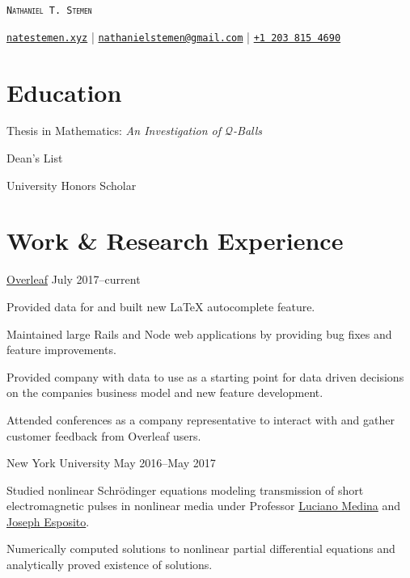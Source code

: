 \documentclass{cultvoucher}
\begin{document}
\begin{flushleft}
    {\Huge{\textsc{\texttt{Nathaniel T. Stemen}}}}

    {\href{https://natestemen.xyz}{\texttt{natestemen.xyz}} |
    \href{mailto:nathanielstemen@gmail.com}{\nolinkurl{nathanielstemen@gmail.com}}} |
    \href{tel:12038154690}{\texttt{+1\,203\,815\,4690}}
\end{flushleft}


\section{Education}
\vspace{-0.9\topsep}
\begin{tightitemize}
    \item Thesis in Mathematics: \textit{An \mbox{Investigation} of \(\mathcal{Q}\)-Balls}
    \item Dean's List
    \item University Honors Scholar
\end{tightitemize}

\section{Work \& Research Experience}

         {\href{https://www.overleaf.com/}{Overleaf}}
         {July 2017--current}
\begin{tightitemize}
    \item Provided data for and built new \LaTeX{} autocomplete feature.
    \item Maintained large Rails and Node web applications by providing bug
          fixes and feature improvements.
    \item Provided company with data to use as a starting point for data driven
          decisions on the companies business model and new feature development.
    \item Attended conferences as a company representative to interact with and
          gather customer feedback from Overleaf users.
\end{tightitemize}

         {New York University}
         {May 2016--May 2017}
\begin{tightitemize}
    \item Studied nonlinear Schr\"{o}dinger equations modeling transmission of
          short electromagnetic pulses in nonlinear media under Professor
          \href{https://www.sites.google.com/a/nyu.edu/luciano-medina/}{Luciano Medina}
          and \href{https://cims.nyu.edu/~esposito/}{Joseph Esposito}.
    \item Numerically computed solutions to nonlinear partial differential
          equations and analytically proved existence of solutions.
\end{tightitemize}
\end{document}
